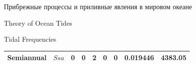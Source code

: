 \begin{chapter}{Прибрежные процессы и приливные явления в мировом океане}
\begin{section}{Theory of Ocean Tides}
\begin{paragraph}{Tidal Frequencies}
\begin{table} [b!]
{\begin{tabular*}{121mm}{@{\extracolsep{\fill}}lcccccccc@{}}
Semiannual        &    $Ssa$     & 0    &  0    &  2    &  0    &  0    & 0.019446      &4383.05   \\[0.5ex]
\hline
\end{tabular*}
{\footnotesize {}}}
\end{table}
%

\end{paragraph}
\end{section}
\end{chapter}
